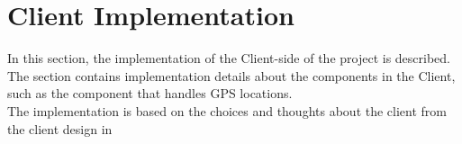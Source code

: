 \section{Client Implementation}
In this section, the implementation of the Client-side of the project is described. The section contains implementation details about the components in the Client, such as the component that handles GPS locations.\\

The implementation is based on the choices and thoughts about the client from the client design in 

